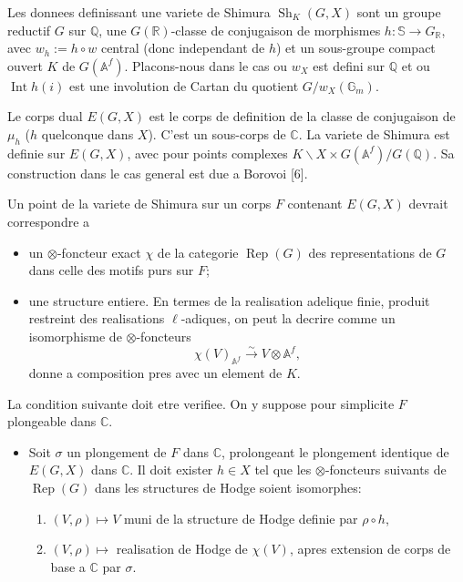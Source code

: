 \documentclass[11pt,a4paper]{article}
\theoremstyle{plain}
\theoremstyle{definition}
\DeclareMathOperator{\Rep}{Rep}
\DeclareMathOperator{\Int}{Int}
\DeclareMathOperator{\Sh}{Sh}
\newcommand{\Q}{\mathbb{Q}}
\newcommand{\C}{\mathbb{C}}
\newcommand{\R}{\mathbb{R}}
\newcommand{\Af}{\mathbb{A}^f}
\begin{document}
Les donnees definissant une variete de Shimura $\Sh_K(G, X)$ sont un groupe reductif $G$ sur $\Q$, une $G(\R)$-classe de conjugaison de morphismes $h: \mathbb{S} \to G_{\R}$, avec $w_h := h \circ w$ central (donc independant de $h$) et un sous-groupe compact ouvert $K$ de $G(\Af)$. Placons-nous dans le cas ou $w_X$ est defini sur $\Q$ et ou $\Int h(i)$ est une involution de Cartan du quotient $G/w_X(\mathbb{G}_m)$.

Le corps dual $E(G, X)$ est le corps de definition de la classe de conjugaison de $\mu_h$ ($h$ quelconque dans $X$). C'est un sous-corps de $\C$. La variete de Shimura est definie sur $E(G, X)$, avec pour points complexes $K \backslash X \times G(\Af) / G(\Q)$. Sa construction dans le cas general est due a Borovoi [6].

Un point de la variete de Shimura sur un corps $F$ contenant $E(G, X)$ devrait correspondre a

\begin{itemize}
\item[(a)] un $\otimes$-foncteur exact $\chi$ de la categorie $\Rep(G)$ des representations de $G$ dans celle des motifs purs sur $F$;

\item[(b)] une structure entiere. En termes de la realisation adelique finie, produit restreint des realisations $\ell$-adiques, on peut la decrire comme un isomorphisme de $\otimes$-foncteurs
$$
\chi(V)_{\Af} \xrightarrow{\sim} V \otimes \Af,
$$
donne a composition pres avec un element de $K$.
\end{itemize}

La condition suivante doit etre verifiee. On y suppose pour simplicite $F$ plongeable dans $\C$.

\begin{itemize}
\item[(c)] Soit $\sigma$ un plongement de $F$ dans $\C$, prolongeant le plongement identique de $E(G, X)$ dans $\C$. Il doit exister $h \in X$ tel que les $\otimes$-foncteurs suivants de $\Rep(G)$ dans les structures de Hodge soient isomorphes:
\begin{enumerate}
\item[(1)] $(V, \rho) \mapsto V$ muni de la structure de Hodge definie par $\rho \circ h$,
\item[(2)] $(V, \rho) \mapsto$ realisation de Hodge de $\chi(V)$, apres extension de corps de base a $\C$ par $\sigma$.
\end{enumerate}
\end{itemize}
\end{document}
